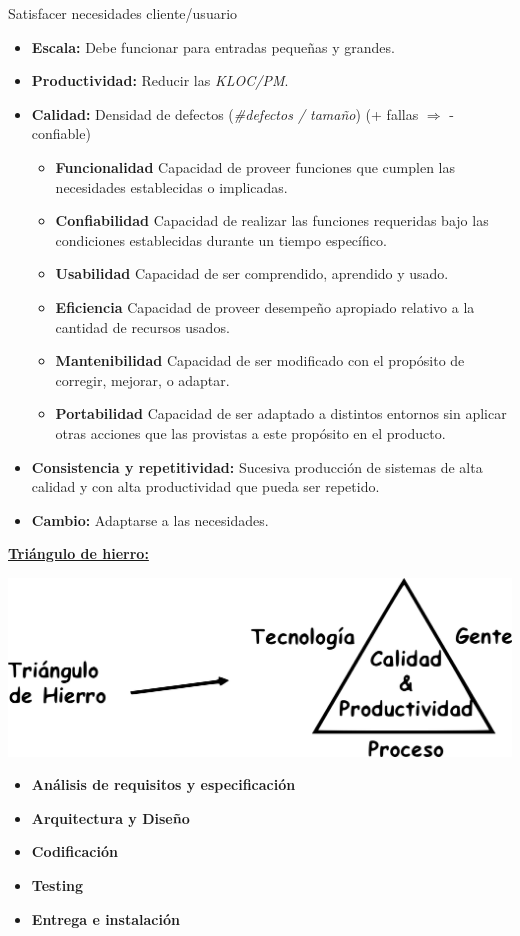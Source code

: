   \PN{} Satisfacer necesidades cliente/usuario
  
  \PN{}
  \begin{itemize}
    \item \textbf{Escala:} Debe funcionar para entradas pequeñas y grandes.
    \item \textbf{Productividad:} Reducir las \textit{KLOC/PM}.
    \item \textbf{Calidad:} Densidad de defectos (\textit{\#defectos / tamaño}) (+ fallas $\Rightarrow$ - confiable)
          \begin{itemize} 
            \item \textbf{Funcionalidad}  Capacidad de proveer funciones que cumplen las necesidades establecidas o
                                          implicadas.
            \item \textbf{Confiabilidad}  Capacidad de realizar las funciones requeridas bajo las condiciones 
                                          establecidas durante un tiempo específico.
            \item \textbf{Usabilidad}     Capacidad de ser comprendido, aprendido y usado.
            \item \textbf{Eficiencia}     Capacidad de proveer desempeño apropiado relativo a la cantidad de recursos
                                          usados.
            \item \textbf{Mantenibilidad} Capacidad de ser modificado con el propósito de corregir, mejorar, o adaptar.
            \item \textbf{Portabilidad}   Capacidad de ser adaptado a distintos entornos sin aplicar otras acciones que
                                          las provistas a este propósito en el producto.
          \end{itemize}
    \item \textbf{Consistencia y repetitividad:}  Sucesiva producción de sistemas de alta calidad y con alta
                                                  productividad que pueda ser repetido.
    \item \textbf{Cambio:} Adaptarse a las necesidades.
  \end{itemize}

  \PN\textbf{\underline{Triángulo de hierro:}}

  \includegraphics[scale=0.4]{graphics/figure_1.png}

  \PN{}
  \begin{itemize}
    \item \textbf{Análisis de requisitos y especificación}
    \item \textbf{Arquitectura y Diseño}
    \item \textbf{Codificación}
    \item \textbf{Testing}
    \item \textbf{Entrega e instalación}
  \end{itemize}

  \pagebreak